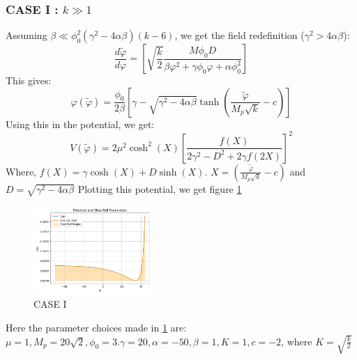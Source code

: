 \documentclass[aps,prd,reprint,preprintnumbers,showpacs,floatfix,nofootinbib,superscript address]{revtex4-2}
\begin{document}
\subsubsection{\textbf{CASE I }: $k \gg 1$}

Assuming $\beta \ll \phi_0^2(\gamma^2 - 4\alpha\beta)(k-6)$, we get the field redefinition ($\gamma^2 > 4\alpha\beta$):
\begin{equation}
    \frac{d\tilde{\varphi}}{d\varphi} = \left[ \sqrt{\frac{k}{2}} \frac{M \phi_0 D}{\beta \varphi^2  +\gamma \phi_0 \varphi +\alpha \phi^2_0} \right]
\end{equation}
This gives:
\begin{equation}
    \varphi(\tilde{\varphi}) = \frac{\phi_0}{2\beta} \left[\gamma - \sqrt{\gamma^2 - 4\alpha \beta} \tanh\left(\frac{\tilde{\varphi}}{M_p\sqrt{k}}-c \right) \right]
\end{equation}
Using this in the potential, we get:
\begin{equation}
    V(\tilde{\varphi}) =  2\mu^2 \cosh^2(X)  \left [ \frac{f(X) }{2\gamma^2 - D^2 + 2\gamma f(2X)} \right]^2
\end{equation}
Where,  $f(X) = \gamma \cosh(X)  + D \sinh(X)$. $X = \left(\frac{\tilde{\varphi}}{M_p\sqrt{k}} - c\right)$ and $D = \sqrt{\gamma^2 - 4\alpha\beta}$
Plotting this potential, we get figure \ref{CASE I potential} 
\begin{figure}[h!]
    \centering
    \includegraphics[width=0.4\textwidth]{Python/Figures/New Potenial with gravity.png}
    \caption{CASE I}
    \label{CASE I potential}
\end{figure}
Here the parameter choices made in \ref{CASE I potential} are: $\mu = 1 ,M_p = 20\sqrt{2} ,\phi_0 = 3.\gamma = 20 ,\alpha = -50,\beta = 1, K = 1, c = -2$, where $K = \sqrt{\frac{k}{2}}$
\end{document}
